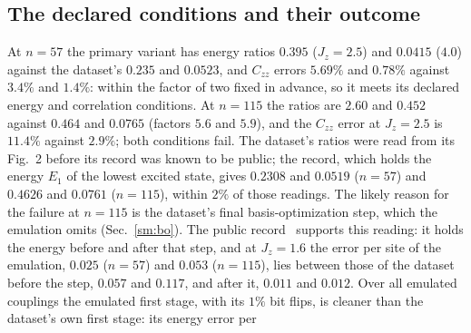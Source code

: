\documentclass[aps,prx,onecolumn,10pt,nofootinbib,longbibliography,floatfix]{revtex4-2}
\theoremstyle{remark}
\newcommand{\Jz}{J_z}
\begin{document}
\subsection{The declared conditions and their outcome}
At $n=57$ the primary variant has energy ratios $0.395$ ($\Jz=2.5$) and $0.0415$ ($4.0$) against the dataset's %
$0.235$ and $0.0523$, and $C_{zz}$ errors $5.69\%$ and $0.78\%$ against $3.4\%$ and $1.4\%$: within the factor of two %
fixed in advance, so it meets its declared energy and correlation conditions. At $n=115$ the ratios are $2.60$ and %
$0.452$ against $0.464$ and $0.0765$ (factors $5.6$ and $5.9$), and the $C_{zz}$ error at $\Jz=2.5$ is $11.4\%$ %
against $2.9\%$; both conditions fail. The dataset's ratios were read from its Fig.~2 before its record was known to %
be public; the record, which holds the energy $E_1$ of the lowest excited state, gives $0.2308$ and $0.0519$ ($n=57$) and $0.4626$ and %
$0.0761$ ($n=115$), within $2\%$ of those readings. The likely reason for the failure at $n=115$ is the dataset's %
final basis-optimization step, which the emulation omits (Sec.~\ref{sm:bo}). The
public record~\cite{jaderberg2026data} supports this reading: it holds the energy before and after that step, and at
$\Jz=1.6$ the error per site of the emulation, $0.025$ ($n=57$) and $0.053$ ($n=115$), lies between those of the %
dataset before the step, $0.057$ and $0.117$, and after it, $0.011$ and $0.012$. Over all emulated couplings the %
emulated first stage, with its $1\%$ bit flips, is cleaner than the dataset's own first stage: its energy error per %
\end{document}
